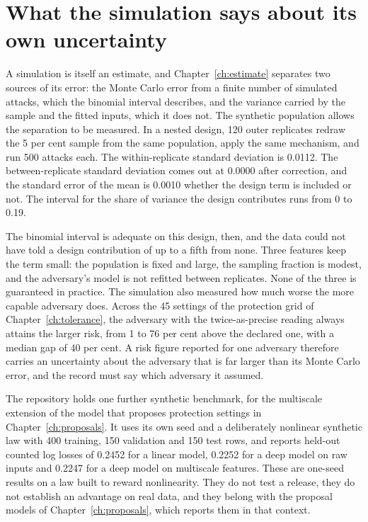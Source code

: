 \section{What the simulation says about its own uncertainty}

A simulation is itself an estimate, and Chapter~\ref{ch:estimate} separates two
sources of its error: the Monte Carlo error from a finite number of simulated
attacks, which the binomial interval describes, and the variance carried by the
sample and the fitted inputs, which it does not. The synthetic population allows the
separation to be measured. In a nested design, 120 outer replicates redraw the 5 per
cent sample from the same population, apply the same mechanism, and run 500 attacks
each. The within-replicate standard deviation is 0.0112. The between-replicate
standard deviation comes out at 0.0000 after correction, and the standard error of
the mean is 0.0010 whether the design term is included or not. The interval for the
share of variance the design contributes runs from 0 to 0.19.

The binomial interval is adequate on this design, then, and the data could not have
told a design contribution of up to a fifth from none. Three features keep the term
small: the population is fixed and large, the sampling fraction is modest, and the
adversary's model is not refitted between replicates. None of the three is
guaranteed in practice. The simulation also measured how much worse the more capable
adversary does. Across the 45 settings of the protection grid of
Chapter~\ref{ch:tolerance}, the adversary with the twice-as-precise reading always
attains the larger risk, from 1 to 76 per cent above the declared one, with a median
gap of 40 per cent.
A risk figure reported for one adversary therefore carries an uncertainty about the
adversary that is far larger than its Monte Carlo error, and the record must say
which adversary it assumed.

The repository holds one further synthetic benchmark, for the multiscale extension
of the model that proposes protection settings in Chapter~\ref{ch:proposals}. It
uses its own seed and a deliberately nonlinear synthetic law with 400 training, 150
validation and 150 test rows, and reports held-out counted log losses of 0.2452 for a
linear model, 0.2252 for a deep model on raw inputs and 0.2247 for a deep model on
multiscale features.
These are one-seed results on a law built to reward nonlinearity. They do not test a
release, they do not establish an advantage on real data, and they belong with the
proposal models of Chapter~\ref{ch:proposals}, which reports them in that context.

